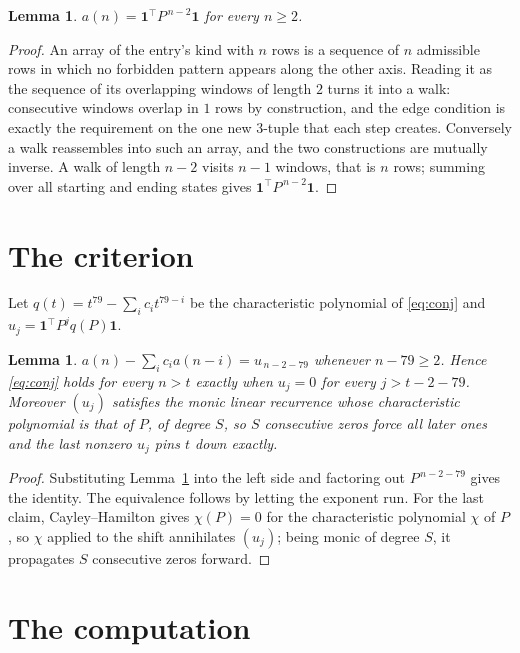 \documentclass[11pt,a4paper]{article}
\theoremstyle{plain}
\newtheorem{lemma}[theorem]{Lemma}
\theoremstyle{definition}
\begin{document}
\begin{lemma}\label{lem:walk}
$a(n)=\mathbf{1}^{\!\top}P^{\,n-2}\mathbf{1}$ for every $n\ge2$.
\end{lemma}

\begin{proof}
An array of the entry's kind with $n$ rows is a sequence of $n$ admissible rows in
which no forbidden pattern appears along the other axis. Reading it as the sequence of its
overlapping windows of length $2$ turns it into a walk: consecutive windows overlap in
$1$ rows by construction, and the edge condition is exactly the requirement on the one
new $3$-tuple that each step creates. Conversely a walk reassembles into such an array,
and the two constructions are mutually inverse. A walk of length $n-2$ visits $n-1$
windows, that is $n$ rows; summing over all starting and ending states gives
$\mathbf{1}^{\!\top}P^{\,n-2}\mathbf{1}$.
\end{proof}

\section{The criterion}

Let $q(t)=t^{79}-\sum_i c_i t^{79-i}$ be the characteristic polynomial of
\eqref{eq:conj} and $u_j=\mathbf{1}^{\!\top}P^{j}q(P)\mathbf{1}$.

\begin{lemma}\label{lem:crit}
$a(n)-\sum_i c_i a(n-i)=u_{\,n-2-79}$ whenever $n-79\ge2$. Hence
\eqref{eq:conj} holds for every $n>t$ exactly when $u_j=0$ for every
$j>t-2-79$. Moreover $(u_j)$ satisfies the monic linear recurrence whose
characteristic polynomial is that of $P$, of degree $S$, so $S$ consecutive zeros force all
later ones and the last nonzero $u_j$ pins $t$ down exactly.
\end{lemma}

\begin{proof}
Substituting Lemma~\ref{lem:walk} into the left side and factoring out
$P^{\,n-2-79}$ gives the identity. The equivalence follows by letting the exponent
run. For the last claim, Cayley--Hamilton gives $\chi(P)=0$ for the characteristic
polynomial $\chi$ of $P$, so $\chi$ applied to the shift annihilates $(u_j)$; being monic of
degree $S$, it propagates $S$ consecutive zeros forward.
\end{proof}

\section{The computation}
\end{document}
